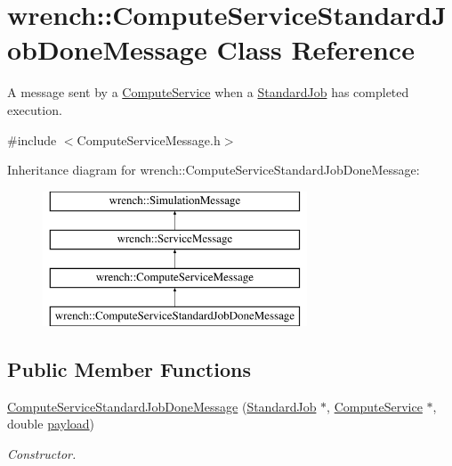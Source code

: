 \hypertarget{classwrench_1_1_compute_service_standard_job_done_message}{}\section{wrench\+:\+:Compute\+Service\+Standard\+Job\+Done\+Message Class Reference}
\label{classwrench_1_1_compute_service_standard_job_done_message}


A message sent by a \hyperlink{classwrench_1_1_compute_service}{Compute\+Service} when a \hyperlink{classwrench_1_1_standard_job}{Standard\+Job} has completed execution.  




{\ttfamily \#include $<$Compute\+Service\+Message.\+h$>$}

Inheritance diagram for wrench\+:\+:Compute\+Service\+Standard\+Job\+Done\+Message\+:\begin{figure}[H]
\begin{center}
\leavevmode
\includegraphics[height=4.000000cm]{classwrench_1_1_compute_service_standard_job_done_message}
\end{center}
\end{figure}
\subsection*{Public Member Functions}
\begin{DoxyCompactItemize}
\item 
\hyperlink{classwrench_1_1_compute_service_standard_job_done_message_ad61a199556e2913460e158e2ac55bb9d}{Compute\+Service\+Standard\+Job\+Done\+Message} (\hyperlink{classwrench_1_1_standard_job}{Standard\+Job} $\ast$, \hyperlink{classwrench_1_1_compute_service}{Compute\+Service} $\ast$, double \hyperlink{classwrench_1_1_simulation_message_a914f2732713f7c02898e66f05a7cb8a1}{payload})
\begin{DoxyCompactList}\small\item\em Constructor. \end{DoxyCompactList}\end{DoxyCompactItemize}

